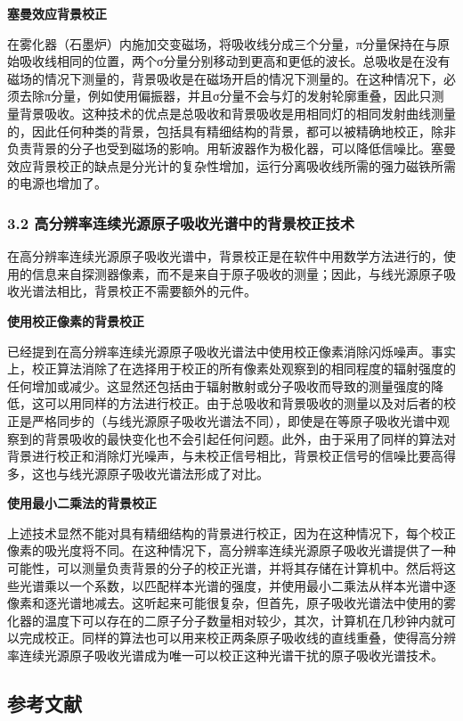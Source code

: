 \textbf{塞曼效应背景校正}

在雾化器（石墨炉）内施加交变磁场，将吸收线分成三个分量，π分量保持在与原始吸收线相同的位置，两个σ分量分别移动到更高和更低的波长。总吸收是在没有磁场的情况下测量的，背景吸收是在磁场开启的情况下测量的。在这种情况下，必须去除π分量，例如使用偏振器，并且σ分量不会与灯的发射轮廓重叠，因此只测量背景吸收。这种技术的优点是总吸收和背景吸收是用相同灯的相同发射曲线测量的，因此任何种类的背景，包括具有精细结构的背景，都可以被精确地校正，除非负责背景的分子也受到磁场的影响。用斩波器作为极化器，可以降低信噪比。塞曼效应背景校正的缺点是分光计的复杂性增加，运行分离吸收线所需的强力磁铁所需的电源也增加了。

\subsubsection{3.2 高分辨率连续光源原子吸收光谱中的背景校正技术}

在高分辨率连续光源原子吸收光谱中，背景校正是在软件中用数学方法进行的，使用的信息来自探测器像素，而不是来自于原子吸收的测量；因此，与线光源原子吸收光谱法相比，背景校正不需要额外的元件。

\textbf{使用校正像素的背景校正}

已经提到在高分辨率连续光源原子吸收光谱法中使用校正像素消除闪烁噪声。事实上，校正算法消除了在选择用于校正的所有像素处观察到的相同程度的辐射强度的任何增加或减少。这显然还包括由于辐射散射或分子吸收而导致的测量强度的降低，这可以用同样的方法进行校正。由于总吸收和背景吸收的测量以及对后者的校正是严格同步的（与线光源原子吸收光谱法不同），即使是在等原子吸收光谱中观察到的背景吸收的最快变化也不会引起任何问题。此外，由于采用了同样的算法对背景进行校正和消除灯光噪声，与未校正信号相比，背景校正信号的信噪比要高得多，这也与线光源原子吸收光谱法形成了对比。

\textbf{使用最小二乘法的背景校正}

上述技术显然不能对具有精细结构的背景进行校正，因为在这种情况下，每个校正像素的吸光度将不同。在这种情况下，高分辨率连续光源原子吸收光谱提供了一种可能性，可以测量负责背景的分子的校正光谱，并将其存储在计算机中。然后将这些光谱乘以一个系数，以匹配样本光谱的强度，并使用最小二乘法从样本光谱中逐像素和逐光谱地减去。这听起来可能很复杂，但首先，原子吸收光谱法中使用的雾化器的温度下可以存在的二原子分子数量相对较少，其次，计算机在几秒钟内就可以完成校正。同样的算法也可以用来校正两条原子吸收线的直线重叠，使得高分辨率连续光源原子吸收光谱成为唯一可以校正这种光谱干扰的原子吸收光谱技术。

\subsection{参考文献}

